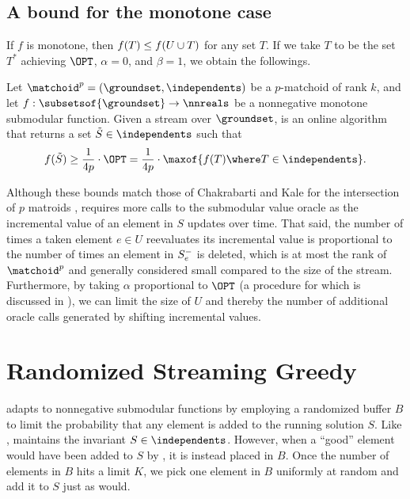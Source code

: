 \documentclass[oneside,letterpaper]{scrartcl} \usepackage{macros}
\newcommand{\mindex}{\ell}
\newcommand{\pmatchoid}{\matchoid^p} \newcommand{\defpmatchoid}{\pmatchoid = (\groundset,\independents)} \newcommand{\matroidI}{\matroid_{\mindex}} \newcommand{\groundsetI}{\groundset_{\mindex}} \newcommand{\independentsI}{\independents_{\mindex}} \newcommand{\defmatroidI}{\matroidI = (\groundsetI,\independentsI)} \newcommand{\offlineratio}{\gamma_p} \newcommand{\optset}{T^*}
\begin{document}
\subsection{A bound for the monotone case}
 If $f$ is monotone, then $f(T) \leq f(U \cup T)$ for any set
$T$. If we take $T$ to be the set $\optset$ achieving $\OPT$, $\alpha
= 0$, and $\beta = 1$, we obtain the followings.
\begin{corollary}Let $\defpmatchoid$ be a $p$-matchoid of rank $k$, and let $f:
  \subsetsof{\groundset} \to \nnreals$ be a nonnegative monotone
  submodular function. Given a stream over $\groundset$,
   is an online algorithm that
  returns a set $\finalset \in \independents$ such that
  \begin{align*}
    f(\finalset) \geq \frac{1}{4p} \cdot \OPT = \frac{1}{4p} \cdot
    \maxof{f(T) \where T \in \independents}.
  \end{align*}
\end{corollary}
\begin{remark}
  Although these bounds match those of Chakrabarti and Kale for the
  intersection of $p$ matroids \cite{ck-smms-14},
   requires more calls to the submodular
  value oracle as the incremental value of an element in $S$ updates
  over time. That said, the number of times a taken element $e \in U$
  reevaluates its incremental value is proportional to the number of
  times an element in $S_{e}^-$ is deleted, which is at most the
  rank of $\pmatchoid$ and generally considered small compared to the
  size of the stream.  Furthermore, by taking $\alpha$ proportional to
  $\OPT$ (a procedure for which is discussed in
  ), we can limit the size of $U$ and
  thereby the number of additional oracle calls generated by shifting
  incremental values.
\end{remark}



\section{Randomized Streaming Greedy}

\newcommand{\buffer}{B}\newcommand{\bufferlimit}{K}\newcommand{\instance}{G}\newcommand{\finalbuffer}{\tilde{B}}\newcommand{\bestset}{\hat{S}}

 adapts
 to nonnegative submodular functions by
employing a randomized buffer $\buffer$ to limit the probability that
any element is added to the running solution $S$.  Like
, 
maintains the invariant $S \in \independents$. However, when a
``good'' element would have been added to $S$ by
, it is instead placed in $\buffer$. Once
the number of elements in $\buffer$ hits a limit $K$, we pick one
element in $\buffer$ uniformly at random and add it to $S$ just as
 would.
\end{document}
